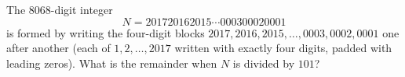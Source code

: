 The $8068$-digit integer
\[
N=201720162015\cdots000300020001
\]
is formed by writing the four-digit blocks $2017,2016,2015,\dots,0003,0002,0001$ one after another (each of $1,2,\dots,2017$ written with exactly four digits, padded with leading zeros). What is the remainder when $N$ is divided by $101$?
